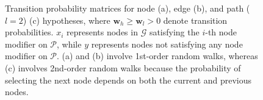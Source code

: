 \documentclass{article}
\begin{document}
\begin{figure}[htbp]
\begin{subfigure}[b]{0.3\textwidth}
    \caption{}
    \end{subfigure}
    \caption{Transition probability matrices for node (a), edge (b), and path ($l=2$) (c) hypotheses, where $\boldsymbol{w}_h \geq \boldsymbol{w}_l > 0$ denote transition probabilities. $x_i$ represents nodes in $\mathcal{G}$ satisfying the $i$-th node modifier on $\mathcal{P}$, while $y$ represents nodes not satisfying any node modifier on $\mathcal{P}$. (a) and (b) involve 1st-order random walks, whereas (c) involves 2nd-order random walks because the probability of selecting the next node depends on both the current and previous nodes.}
\end{figure}
\end{document}
